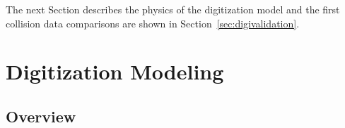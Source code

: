   



The next Section describes the physics of the digitization model and the first collision data comparisons are shown in Section~\ref{sec:digivalidation}.


\section{Digitization Modeling}
\label{sec:fullmodel}

\subsection{Overview}

